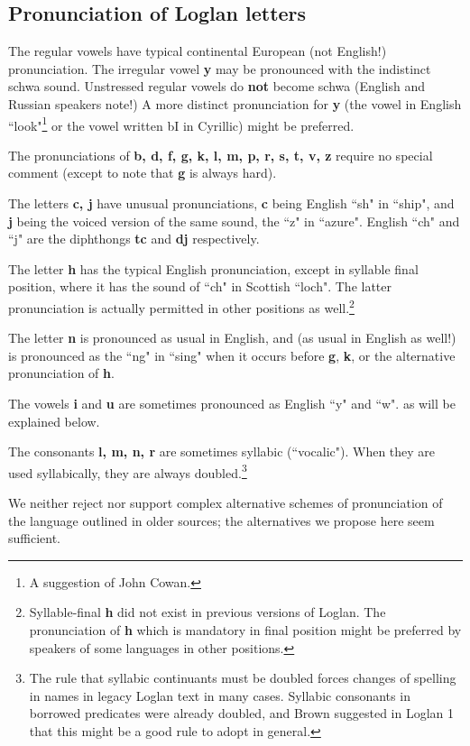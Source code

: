 \documentclass[12pt]{book}
\begin{document}
\subsection{Pronunciation of Loglan letters}

The regular vowels have typical continental European (not English!) pronunciation.  The irregular vowel {\bf y} may be pronounced with the indistinct schwa sound.  Unstressed regular vowels do {\bf not} become schwa (English and Russian speakers note!)  A more distinct pronunciation for {\bf y} (the vowel in English ``look"\footnote{A suggestion of John Cowan.} or the vowel written bI in Cyrillic) might be preferred.

The pronunciations of {\bf b, d, f, g,  k, l, m,  p, r, s, t, v, z} require no special comment (except to note that {\bf g} is always hard).

The letters {\bf c, j} have unusual pronunciations, {\bf c} being English ``sh" in ``ship", and {\bf j} being the voiced version of the same sound, the ``z" in ``azure".  English
``ch" and ``j" are the diphthongs {\bf tc} and {\bf dj} respectively.

The letter {\bf h} has the typical English pronunciation, except in syllable final position, where it has the sound of ``ch" in Scottish ``loch".  The latter pronunciation is actually permitted in other positions as well.\footnote{Syllable-final {\bf h} did not exist in previous versions of Loglan.  The pronunciation of {\bf h} which is mandatory in final position might be preferred by speakers of some languages in other positions.}

The letter {\bf n} is pronounced as usual in English, and (as usual in English as well!) is pronounced as the ``ng" in ``sing" when it occurs before {\bf g}, {\bf k}, or the alternative pronunciation of {\bf h}.

The vowels {\bf i} and {\bf u} are sometimes pronounced as English ``y" and ``w". as will be explained below.

The consonants {\bf l, m, n, r} are sometimes syllabic (``vocalic").  When they are used syllabically, they are always doubled.\footnote{The rule that syllabic continuants must be doubled forces changes of spelling in names in legacy Loglan text in many cases.  Syllabic consonants in borrowed predicates were already doubled, and Brown suggested in Loglan 1 that this might be a good rule to adopt in general.}

We neither reject nor support complex alternative schemes of pronunciation of the language outlined in older sources;  the alternatives we propose here seem sufficient.
\end{document}
